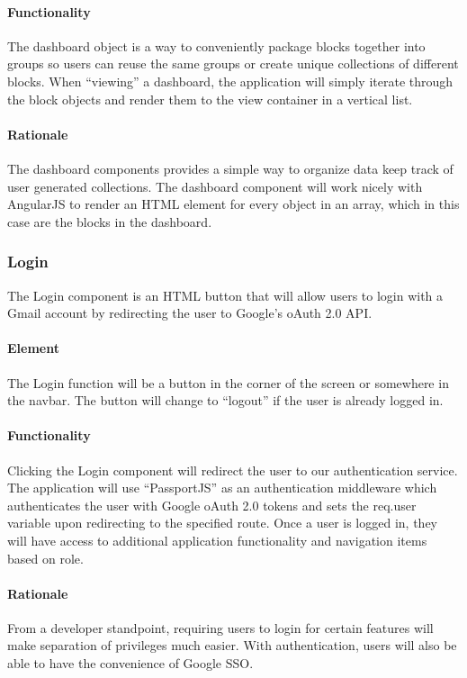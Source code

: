         \paragraph{Functionality}
            The dashboard object is a way to conveniently package blocks together into groups so users can reuse the same groups or create unique collections of different blocks. 
            When ``viewing'' a dashboard, the application will simply iterate through the block objects and render them to the view container in a vertical list.
        \paragraph{Rationale} 
            The dashboard components provides a simple way to organize data keep track of user generated collections. 
            The dashboard component will work nicely with AngularJS to render an HTML element for every object in an array, which in this case are the blocks in the dashboard.

    \subsubsection{Login}
        The Login component is an HTML button that will allow users to login with a Gmail account by redirecting the user to Google's oAuth 2.0 API.
        \paragraph{Element}
            The Login function will be a button in the corner of the screen or somewhere in the navbar. The button will change to ``logout'' if the user is already logged in.
        \paragraph{Functionality}
            Clicking the Login component will redirect the user to our authentication service. 
            The application will use ``PassportJS'' as an authentication middleware which authenticates the user with Google oAuth 2.0 tokens and sets the req.user variable upon redirecting to the specified route. 
            Once a user is logged in, they will have access to additional application functionality and navigation items based on role.
        \paragraph{Rationale}
            From a developer standpoint, requiring users to login for certain features will make separation of privileges much easier. With authentication, users will also be able to have the convenience of Google SSO.

